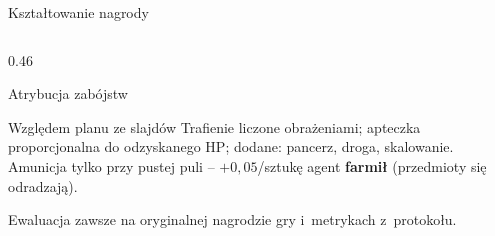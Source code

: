 \documentclass[aspectratio=169,10pt]{beamer}
\begin{document}
\begin{frame}{Kształtowanie nagrody}
\begin{columns}[T,onlytextwidth]
\begin{column}{0.46\textwidth}
\begin{infocard}{\faExclamationTriangle}{Atrybucja zabójstw}
      \end{infocard}
      \begin{infocard}{\faArrowUp}{Względem planu ze slajdów}
        Trafienie liczone obrażeniami; apteczka proporcjonalna do odzyskanego HP;
        dodane: pancerz, droga, skalowanie. Amunicja tylko przy pustej puli --
        $+0{,}05$/sztukę agent \textbf{farmił} (przedmioty się odradzają).
      \end{infocard}
      {\scriptsize\color{muted}\faInfoCircle\hspace{1.5mm}Ewaluacja zawsze na oryginalnej
      nagrodzie gry i~metrykach z~protokołu.\par}
    \end{column}
  \end{columns}
\end{frame}
\end{document}
